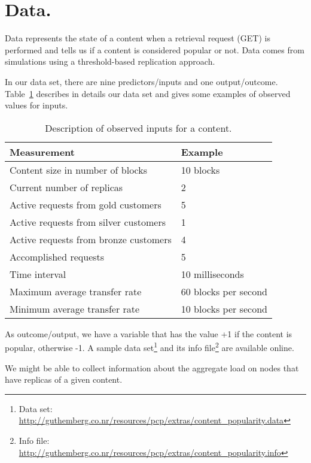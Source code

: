 	\section{Data.}

		Data represents the state of a content when a retrieval 
		request (GET) is performed and tells us if a content is 
		considered popular or not. Data comes from simulations
		using a threshold-based replication approach.
	
		In our data set, there are nine predictors/inputs and one 
		output/outcome. Table~\ref{table1} describes in details
		our data set and gives some examples of observed 
		values for inputs. 

		\begin{table}[h]
			\centering
			\begin{tabular}{ll}
				\hline
				Measurement &  Example \\
				\hline
				Content size in number of blocks &10 blocks \\
				Current number of replicas & 2 \\
				Active requests from gold customers  &  5 \\
				Active requests from silver customers &  1 \\
				Active requests from bronze customers &  4 \\
				Accomplished requests &  5 \\
				Time interval &  10 milliseconds \\
				Maximum average transfer rate  &  60 blocks per second\\
				Minimum average transfer rate  &  10 blocks per second \\
				\hline
			\end{tabular}
			\caption{Description of observed inputs for a content.}
			\label{table1}
		\end{table}


		As outcome/output, we have a variable that has the value +1
		if the content is popular, otherwise -1. A 
		sample data set\footnote{Data set: \url{http://guthemberg.co.nr/resources/pcp/extras/content_popularity.data}} and 
		its info file\footnote{Info file: \url{http://guthemberg.co.nr/resources/pcp/extras/content_popularity.info}}
		are available online.  

		We might be able to collect information about the aggregate load
		on nodes that have replicas of a given content. 


